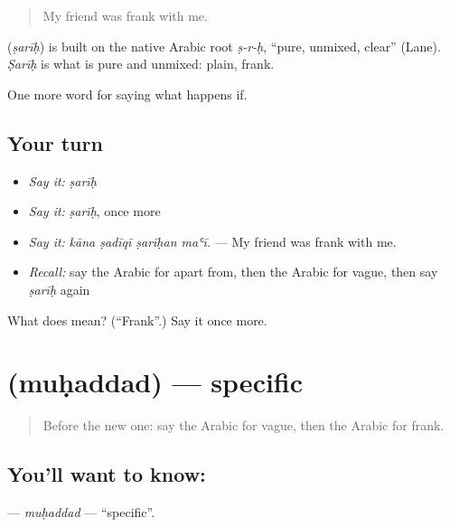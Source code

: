 \begin{quote}
My friend was frank with me.
\end{quote}

\begin{cousinweb}
\textbf{} (\emph{ṣarīḥ}) is built on the native Arabic root \emph{ṣ-r-ḥ}, \textquotedblleft{}pure, unmixed, clear\textquotedblright{} (Lane). \emph{Ṣarīḥ} is what is pure and unmixed: plain, frank.
\end{cousinweb}

\begin{grammarlens}[title={What you've built}]
One more word for saying what happens if.
\end{grammarlens}

\subsection*{Your turn}
\begin{itemize}
\raggedright
  \item \emph{Say it:} \emph{ṣarīḥ}
  \item \emph{Say it:} \emph{ṣarīḥ}, once more
  \item \emph{Say it:} \emph{kāna ṣadīqī ṣarīḥan maʿī.} — My friend was frank with me.
  \item \emph{Recall:} say the Arabic for apart from, then the Arabic for vague, then say \emph{ṣarīḥ} again
\end{itemize}

\begin{tcolorbox}[breakable,colback=teal!4,colframe=teal!35!black,title={Before you move on}]
What does  mean? (\textquotedblleft{}Frank\textquotedblright{}.) Say it once more.
\end{tcolorbox}
\section[\texorpdfstring{\ar{محدد} (muḥaddad)}{محدد (muḥaddad)}]{ (muḥaddad) — specific}

\label{lesson:AR-C417-muhaddad}



\begin{quote}
Before the new one: say the Arabic for vague, then the Arabic for frank.
\end{quote}

\subsection*{You'll want to know: }
\textbf{} — \emph{muḥaddad} — \textquotedblleft{}specific\textquotedblright{}.

